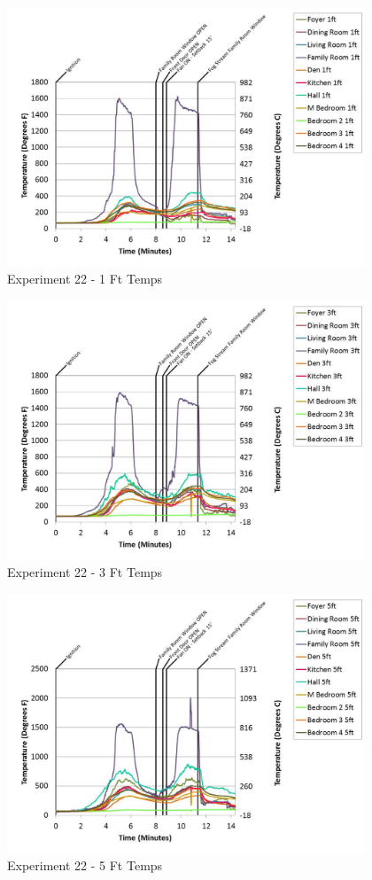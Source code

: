 \documentclass{article}
\begin{document}
\begin{appendices}
	\begin{figure}[h!]
		\centering
		\includegraphics[height=3.05in]{0_Images/Results_Charts/Exp_22_Charts/1FtTemps.pdf}
		\caption{Experiment 22 - 1 Ft Temps}
	\end{figure}
 

	\begin{figure}[h!]
		\centering
		\includegraphics[height=3.05in]{0_Images/Results_Charts/Exp_22_Charts/3FtTemps.pdf}
		\caption{Experiment 22 - 3 Ft Temps}
	\end{figure}
 
	\clearpage

	\begin{figure}[h!]
		\centering
		\includegraphics[height=3.05in]{0_Images/Results_Charts/Exp_22_Charts/5FtTemps.pdf}
		\caption{Experiment 22 - 5 Ft Temps}
	\end{figure}
 


\end{appendices}
\end{document}
